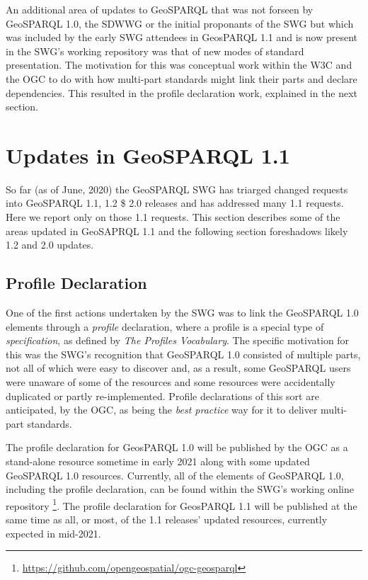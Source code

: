 \documentclass[runningheads]{llncs}
\begin{document}
An additional area of updates to GeoSPARQL that was not forseen by GeoSPARQL 1.0, the SDWWG or the initial proponants of the SWG
but which was included by the early SWG attendees in GeosPARQL 1.1 and is now present in the SWG's working repository was that 
of new modes of standard presentation. The motivation for this was conceptual work within the W3C and the OGC to do with how 
multi-part standards might link their parts and declare dependencies. This resulted in the profile declaration work, explained 
in the next section.


\section{Updates in GeoSPARQL 1.1}\label{sec:newfeatures}
So far (as of June, 2020) the GeoSPARQL SWG has triarged changed requests into GeoSPARQL 1.1, 1.2 \$ 2.0 releases and has addressed
many 1.1 requests. Here we report only on those 1.1 requests. This section describes some of the areas updated in GeoSAPRQL 1.1
and the following section foreshadows likely 1.2 and 2.0 updates.

\subsection{Profile Declaration}\label{sec:profiledec}
One of the first actions undertaken by the SWG was to link the GeoSPARQL 1.0 elements through a \textit{profile} 
declaration, where a profile is a special type of \textit{specification}, as defined by \textit{The Profiles Vocabulary}\cite{atkinson_profiles_2020}. 
The specific motivation for this was the SWG's recognition that GeoSPARQL 1.0 consisted of multiple parts, not all
of which were easy to discover and, as a result, some GeoSPARQL users were unaware of some of the resources and some
resources were accidentally duplicated or partly re-implemented. Profile declarations of this sort are anticipated, by the OGC, 
as being the \textit{best practice} way for it to deliver multi-part standards.

The profile declaration for GeosPARQL 1.0 will be published by the OGC as a stand-alone resource sometime in early 2021 along with some 
updated GeoSPARQL 1.0 resources. Currently, all of the elements of GeoSPARQL 1.0, including the profile declaration, 
can be found within the SWG's working online repository \footnote{\url{https://github.com/opengeospatial/ogc-geosparql}}.
The profile declaration for GeosPARQL 1.1 will be published at the same time as all, or most, of the 1.1 releases' updated
resources, currently expected in mid-2021.
\end{document}
